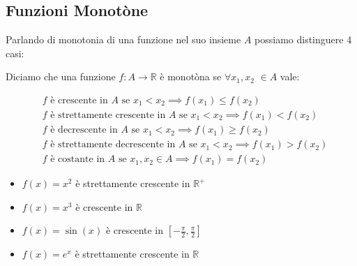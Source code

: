 \subsection{Funzioni Monotòne}
Parlando di monotonia di una funzione nel suo insieme $A$ possiamo distinguere 4 casi:
    \begin{definizione}
        Diciamo che una funzione $f: A \to \mathbb{R}$ è monotòna se $\forall{x_1, x_2}$ $\in A$ vale:
    \end{definizione}
\begin{align}
    &f \text{ è crescente in } A \text{ se } x_1 < x_2 \implies f(x_1) \leq f(x_2) \\
    &f \text{ è strettamente crescente in } A \text{ se } x_1 < x_2 \implies f(x_1) < f(x_2) \\
    &f \text{ è decrescente in } A \text{ se } x_1 < x_2 \implies f(x_1) \geq f(x_2) \\
    &f \text{ è strettamente decrescente in } A \text{ se } x_1 < x_2 \implies f(x_1) > f(x_2) \\
    &f \text{ è costante in } A \text{ se } x_1, x_2 \in A \implies f(x_1) = f(x_2)
\end{align}
\begin{esempio}
    \begin{itemize}
        \item $f(x)=x^2$ è strettamente crescente in $\mathbb{R}^+$
        \item $f(x)=x^3$ è crescente in $\mathbb{R}$
        \item $f(x)=\sin(x)$ è crescente in $\left[-\frac{\pi}{2},\frac{\pi}{2}\right]$
        \item $f(x)= e^{x}$ è strettamente crescente in $\mathbb{R}$
    \end{itemize}
\end{esempio}